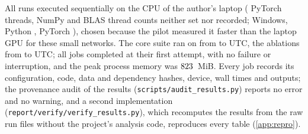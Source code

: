 All runs executed sequentially on the CPU of the author's laptop ( PyTorch threads, NumPy and BLAS thread counts neither set nor recorded; Windows, Python , PyTorch ), chosen because the pilot measured it faster than the laptop GPU for these small networks.
The core suite ran on  from  to  UTC, the ablations from  to  UTC; all  jobs completed at their first attempt, with no failure or interruption, and the peak process memory was $\vn{s10.peak_rss}{823}$~MiB.
Every job records its configuration, code, data and dependency hashes, device, wall times and outputs; the provenance audit of the results (\texttt{scripts/audit\_results.py}) reports no error and no warning, and a second implementation (\texttt{report/verify/verify\_results.py}), which recomputes the results from the raw run files without the project's analysis code, reproduces every table (\cref{app:repro}).
